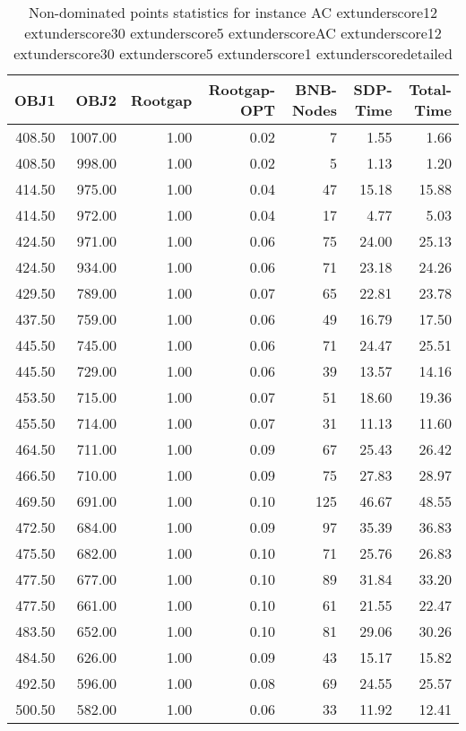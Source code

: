 \begin{table}
\caption{Non-dominated points statistics for instance AC	extunderscore12	extunderscore30	extunderscore5	extunderscoreAC	extunderscore12	extunderscore30	extunderscore5	extunderscore1	extunderscoredetailed}
\label{tab:stats/AC_12_30_5_AC_12_30_5_1_detailed}
\begin{tabular}{rrrrrrr}
\toprule
OBJ1 & OBJ2 & Rootgap & Rootgap-OPT & BNB-Nodes & SDP-Time & Total-Time \\
\midrule
408.50 & 1007.00 & 1.00 & 0.02 & 7 & 1.55 & 1.66 \\
408.50 & 998.00 & 1.00 & 0.02 & 5 & 1.13 & 1.20 \\
414.50 & 975.00 & 1.00 & 0.04 & 47 & 15.18 & 15.88 \\
414.50 & 972.00 & 1.00 & 0.04 & 17 & 4.77 & 5.03 \\
424.50 & 971.00 & 1.00 & 0.06 & 75 & 24.00 & 25.13 \\
424.50 & 934.00 & 1.00 & 0.06 & 71 & 23.18 & 24.26 \\
429.50 & 789.00 & 1.00 & 0.07 & 65 & 22.81 & 23.78 \\
437.50 & 759.00 & 1.00 & 0.06 & 49 & 16.79 & 17.50 \\
445.50 & 745.00 & 1.00 & 0.06 & 71 & 24.47 & 25.51 \\
445.50 & 729.00 & 1.00 & 0.06 & 39 & 13.57 & 14.16 \\
453.50 & 715.00 & 1.00 & 0.07 & 51 & 18.60 & 19.36 \\
455.50 & 714.00 & 1.00 & 0.07 & 31 & 11.13 & 11.60 \\
464.50 & 711.00 & 1.00 & 0.09 & 67 & 25.43 & 26.42 \\
466.50 & 710.00 & 1.00 & 0.09 & 75 & 27.83 & 28.97 \\
469.50 & 691.00 & 1.00 & 0.10 & 125 & 46.67 & 48.55 \\
472.50 & 684.00 & 1.00 & 0.09 & 97 & 35.39 & 36.83 \\
475.50 & 682.00 & 1.00 & 0.10 & 71 & 25.76 & 26.83 \\
477.50 & 677.00 & 1.00 & 0.10 & 89 & 31.84 & 33.20 \\
477.50 & 661.00 & 1.00 & 0.10 & 61 & 21.55 & 22.47 \\
483.50 & 652.00 & 1.00 & 0.10 & 81 & 29.06 & 30.26 \\
484.50 & 626.00 & 1.00 & 0.09 & 43 & 15.17 & 15.82 \\
492.50 & 596.00 & 1.00 & 0.08 & 69 & 24.55 & 25.57 \\
500.50 & 582.00 & 1.00 & 0.06 & 33 & 11.92 & 12.41 \\

\end{tabular}
\end{table}
